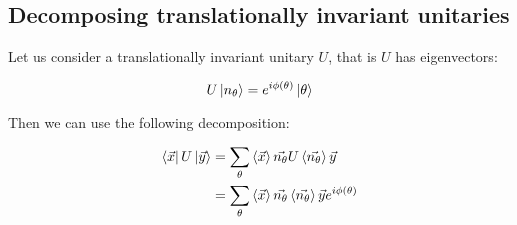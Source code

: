 \subsection{Decomposing translationally invariant unitaries}

Let us consider a translationally invariant unitary $U$, that is $U$ has eigenvectors:

\[U \ket{n_{\theta}} = e^{i\phi(\theta)} \ket{\theta}\]

Then we can use the following decomposition:

\begin{align*}
  \bra{\vec{x}} U \ket{\vec{y}} &= \sum_{\theta}\braket{\vec{x}}{\vec{n_{\theta}}} U \braket{\vec{n_{\theta}}}{\vec{y}}  \\
   &= \sum_{\theta}\braket{\vec{x}}{\vec{n_{\theta}}} \braket{\vec{n_{\theta}}}{\vec{y}} e^{i \phi(\theta)}
\end{align*}
